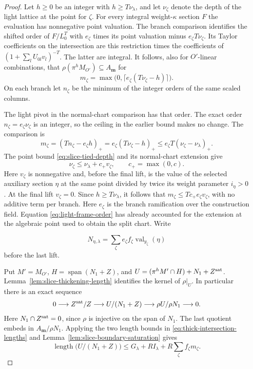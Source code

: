 \begin{proof}
Let \(h\ge0\) be an integer with \(h\ge T\nu_\lambda\), and
let \(\nu_\zeta\) denote the depth of the light lattice at
the point for \(\zeta\). For every integral weight-\(\kappa\)
section \(F\) the evaluation has nonnegative point valuation.
The branch comparison identifies the shifted order of
\(F/L_0^T\) with \(e_\zeta\) times its point valuation
minus \(e_\zeta T\nu_\zeta\). Its Taylor coefficients on
the intersection are this restriction times the coefficients
of \((1+\sum_l U_{0l}v_l)^{-T}\). The latter are integral.
It follows, also for \(O'\)-linear combinations, that
\(\rho(\pi^h M_{O'})\subseteq A_{\boldsymbol m}\) for
\[
 m_\zeta=\max\bigl(0,\lceil e_\zeta(T\nu_\zeta-h)\rceil\bigr).
\]
On each branch let \(n_\zeta\) be the minimum of the integer
orders of the same scaled columns.

The light pivot in the
normal-chart comparison has that order. The exact order \(n_\zeta=e_\zeta\nu_\zeta\) is an integer,
so the ceiling in the earlier bound makes no change. The
comparison is
\[
 m_\zeta=(Tn_\zeta-e_\zeta h)_+
      =e_\zeta(T\nu_\zeta-h)_+
      \le e_\zeta T(\nu_\zeta-\nu_\lambda)_+ .
\]
The point bound \eqref{eq:slice-tied-depth} and its normal-chart
extension give
\[
 \nu_\zeta\le\nu_\lambda+c_+v_\zeta,\qquad c_+=\max(0,c).
\]
Here \(v_\zeta\) is nonnegative and, before the final lift,
is the value of the selected auxiliary section \(\eta\) at
the same point divided by twice its weight parameter \(i_\eta>0\).
At the final lift \(v_\zeta=0\). Since \(h\ge T\nu_\lambda\),
it follows that \(m_\zeta\le Tc_+e_\zeta v_\zeta\), with no
additive term per branch. Here \(e_\zeta\) is the branch
ramification over the construction field. Equation
\eqref{eq:light-frame-order} has already accounted for the
extension at the algebraic point used to obtain the split chart.
Write

\[
  N_{\eta,\lambda}=\sum_\zeta e_\zeta f_\zeta
\operatorname{val}_{y_\zeta}(\eta)
\]
 before the last lift.

Put \(M'=M_{O'}\), \(H=\operatorname{span}(N_1+Z)\), and
\(U=(\pi^hM'\cap H)+N_1+Z^{\rm sat}\).
Lemma~\ref{lem:slice-thickening-length} identifies the
kernel of \(\rho|_U\). In particular there is an exact sequence
\[
 0\longrightarrow Z^{\rm sat}/Z
  \longrightarrow U/(N_1+Z)
  \longrightarrow \rho U/\rho N_1
  \longrightarrow 0 .
\]
Here \(N_1\cap Z^{\rm sat}=0\), since \(\rho\) is injective
on the span of \(N_1\). The last quotient embeds in
\(A_{\boldsymbol m}/\rho N_1\). Applying the two length
bounds in \eqref{eq:thick-intersection-lengths} and
Lemma~\ref{lem:slice-boundary-saturation} gives
\[
 \operatorname{length}\bigl(U/(N_1+Z)\bigr)
       \le G_\lambda+R I_\lambda
                          +R\sum_\zeta f_\zeta m_\zeta .
\]


\end{proof}
